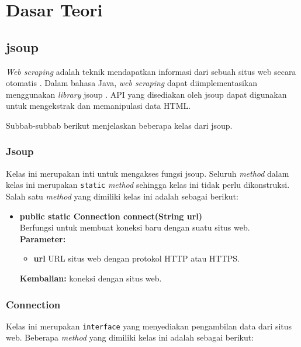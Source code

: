 \chapter{Dasar Teori}
\label{chap:Dasar Teori}

\section{jsoup}
\label{sec:jsoup}

\textit{Web scraping} adalah teknik mendapatkan informasi dari sebuah situs web secara otomatis \cite{Vargiu:2013}. Dalam bahasa Java, \textit{web scraping} dapat diimplementasikan menggunakan \textit{library} jsoup \cite{jsoup}. API yang disediakan oleh jsoup dapat digunakan untuk mengekstrak dan memanipulasi data HTML. 

Subbab-subbab berikut menjelaskan beberapa kelas dari jsoup.

\subsection{Jsoup}

Kelas ini merupakan inti untuk mengakses fungsi jsoup. Seluruh \textit{method} dalam kelas ini merupakan \texttt{static} \textit{method} sehingga kelas ini tidak perlu dikonstruksi. Salah satu \textit{method} yang dimiliki kelas ini adalah sebagai berikut:
\begin{itemize}
	\item \textbf{public static Connection connect(String url)} \\
		Berfungsi untuk membuat koneksi baru dengan suatu situs web. \\
		\textbf{Parameter:}
		\begin{itemize}
			\item \textbf{url} URL situs web dengan protokol HTTP atau HTTPS.
		\end{itemize}
		\textbf{Kembalian:} koneksi dengan situs web.
\end{itemize}

\subsection{Connection}

Kelas ini merupakan \texttt{interface} yang menyediakan pengambilan data dari situs web. Beberapa \textit{method} yang dimiliki kelas ini adalah sebagai berikut:

